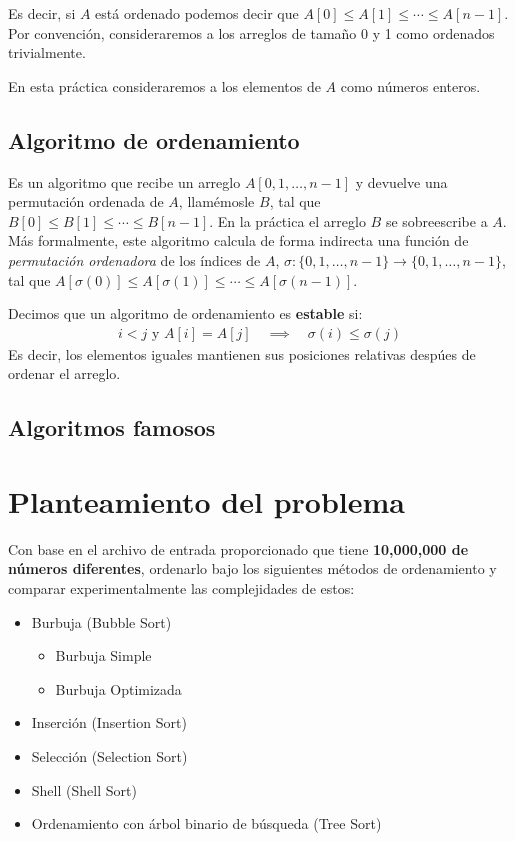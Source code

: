 \documentclass[12pt, fleqn]{report}                             %
\theoremstyle{break}                                            %
\begin{document}
    	    Es decir, si $A$ está ordenado podemos decir que $A[0] \leq A[1] \leq \cdots \leq A[n-1]$. Por convención, consideraremos a los arreglos de tamaño 0 y 1 como ordenados trivialmente.
    	    
    	    En esta práctica consideraremos a los elementos de $A$ como números enteros.
    	
    	\subsection{Algoritmo de ordenamiento}
    	    Es un algoritmo que recibe un arreglo $A[0, 1, \ldots, n-1]$ y devuelve una permutación ordenada de $A$, llamémosle $B$, tal que $B[0] \leq B[1] \leq \cdots \leq B[n-1]$. En la práctica el arreglo $B$ se sobreescribe a $A$. Más formalmente, este algoritmo calcula de forma indirecta una función de \emph{permutación ordenadora} de los índices de $A$, $\sigma : \{0, 1, \ldots, n-1\} \to \{0, 1, \ldots, n-1\}$, tal que $A[\sigma(0)] \leq A[\sigma(1)] \leq \cdots \leq A[\sigma(n-1)]$.
    	    
    	    Decimos que un algoritmo de ordenamiento es \textbf{estable} si:
    	    \begin{align*}
    	        i < j \text{ y } A[i] = A[j] \quad \implies \quad \sigma(i) \leq \sigma(j)
    	    \end{align*}
    	    Es decir, los elementos iguales mantienen sus posiciones relativas despúes de ordenar el arreglo.
    	    
    	\subsection{Algoritmos famosos}
    	    
    	    
	
	
	\section{Planteamiento del problema}
	    
	    Con base en el archivo de entrada proporcionado que tiene \textbf{10,000,000 de números diferentes}, ordenarlo bajo los siguientes métodos de ordenamiento y comparar experimentalmente las complejidades de estos:
	    \begin{itemize}\setlength\itemsep{0em}
	        \item Burbuja (Bubble Sort) \begin{itemize}\setlength\itemsep{0em}
	            \item Burbuja Simple
	            \item Burbuja Optimizada
	        \end{itemize}
	        \item Inserción (Insertion Sort)
	        \item Selección (Selection Sort)
	        \item Shell (Shell Sort)
	        \item Ordenamiento con árbol binario de búsqueda (Tree Sort)
	    \end{itemize}
\end{document}

